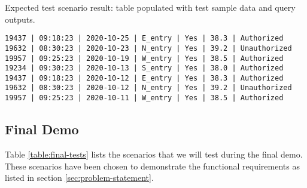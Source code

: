 \noindent
Expected test scenario result: table populated with test sample data and query
outputs.

\begin{listing}[H]
\begin{verbatim}
19437 | 09:18:23 | 2020-10-25 | E_entry | Yes | 38.3 | Authorized
19632 | 08:30:23 | 2020-10-23 | N_entry | Yes | 39.2 | Unauthorized
19957 | 09:25:23 | 2020-10-19 | W_entry | Yes | 38.5 | Authorized
19234 | 09:30:23 | 2020-10-13 | S_entry | Yes | 38.0 | Authorized
19437 | 09:18:23 | 2020-10-12 | E_entry | Yes | 38.3 | Authorized
19632 | 08:30:23 | 2020-10-12 | N_entry | Yes | 39.2 | Unauthorized
19957 | 09:25:23 | 2020-10-11 | W_entry | Yes | 38.5 | Authorized
\end{verbatim}
\end{listing}


\subsection{Final Demo}

Table \ref{table:final-tests} lists the scenarios that we will test during the
final demo. These scenarios have been chosen to demonstrate the functional
requirements as listed in section \ref{sec:problem-statement}.




